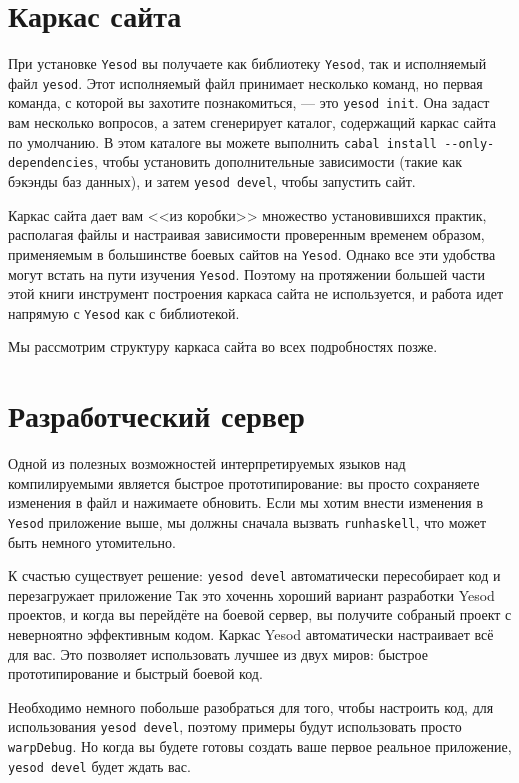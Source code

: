 \section{Каркас сайта}

При установке \texttt{Yesod} вы получаете как библиотеку \texttt{Yesod}, так и исполняемый
файл \texttt{yesod}. Этот исполняемый файл принимает несколько команд, но первая команда,
с которой вы захотите познакомиться, --- это \texttt{yesod init}. Она задаст вам несколько
вопросов, а затем сгенерирует каталог, содержащий каркас сайта по умолчанию. В этом
каталоге вы можете выполнить \lstinline'cabal install --only-dependencies', чтобы
установить дополнительные зависимости (такие как бэкэнды баз данных), и затем
\lstinline'yesod devel', чтобы запустить сайт.

Каркас сайта дает вам <<из коробки>> множество установившихся практик, располагая файлы и
настраивая зависимости проверенным временем образом, применяемым в большинстве боевых
сайтов на \texttt{Yesod}. Однако все эти удобства могут встать на пути изучения
\texttt{Yesod}. Поэтому на протяжении большей части этой книги инструмент построения
каркаса сайта не используется, и работа идет напрямую с \texttt{Yesod} как с библиотекой.

Мы рассмотрим структуру каркаса сайта во всех подробностях позже.

\section{Разработческий сервер}

Одной из полезных возможностей интерпретируемых языков над компилируемыми является быстрое прототипирование: 
вы просто сохраняете изменения в файл и нажимаете обновить. 
Если мы хотим внести изменения в \texttt{Yesod} приложение выше, 
мы должны сначала вызвать \lstinline!runhaskell!, что может быть немного 
утомительно.

К счастью существует решение: \lstinline'yesod devel' автоматически 
пересобирает код и перезагружает приложение Так это хоченнь хороший вариант
разработки Yesod проектов, и когда вы перейдёте на боевой сервер,
вы получите собраный проект с неверноятно эффективным кодом. Каркас Yesod автоматически
настраивает всё для вас. Это позволяет использовать лучшее из двух миров: 
быстрое прототипирование и быстрый боевой код.

Необходимо немного побольше разобраться для того, чтобы настроить код, 
для использования \lstinline!yesod devel!, поэтому примеры будут 
использовать просто \lstinline!warpDebug!. Но когда вы будете готовы
создать ваше первое реальное приложение, \lstinline'yesod devel' будет ждать вас.

